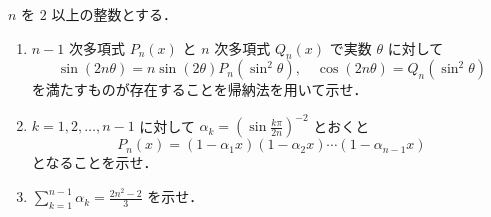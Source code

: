 \documentclass[a4paper,10pt]{ltjsarticle}
\begin{document}
\begin{oframed}
$n$ を $2$ 以上の整数とする．
\begin{enumerate}
  \item $n-1$ 次多項式 $P_n(x)$ と $n$ 次多項式 $Q_n(x)$ で実数 $\theta$ に対して
\[ \sin(2n\theta) = n \sin(2\theta) P_n(\sin^2\theta), \quad \cos(2n\theta) = Q_n(\sin^2\theta) \]
を満たすものが存在することを帰納法を用いて示せ．
  \item $k=1, 2, \dots, n-1$ に対して $\alpha_k = \left(\sin\frac{k\pi}{2n}\right)^{-2}$ とおくと
\[ P_n(x) = (1-\alpha_1 x)(1-\alpha_2 x)\cdots(1-\alpha_{n-1} x) \]
となることを示せ．
  \item $\sum_{k=1}^{n-1} \alpha_k = \frac{2n^2-2}{3}$ を示せ．
\end{enumerate}
\end{oframed}
\setlength{\columnseprule}{0.4pt}
\end{document}

